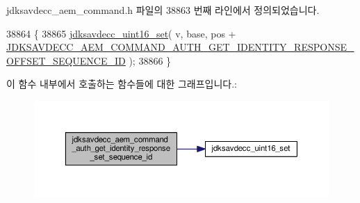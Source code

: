jdksavdecc\+\_\+aem\+\_\+command.\+h 파일의 38863 번째 라인에서 정의되었습니다.


\begin{DoxyCode}
38864 \{
38865     \hyperlink{group__endian_ga14b9eeadc05f94334096c127c955a60b}{jdksavdecc\_uint16\_set}( v, base, pos + 
      \hyperlink{group__command__auth__get__identity__response_gad7814ce95b40a40d7ab7251616d417e9}{JDKSAVDECC\_AEM\_COMMAND\_AUTH\_GET\_IDENTITY\_RESPONSE\_OFFSET\_SEQUENCE\_ID}
       );
38866 \}
\end{DoxyCode}


이 함수 내부에서 호출하는 함수들에 대한 그래프입니다.\+:
\nopagebreak
\begin{figure}[H]
\begin{center}
\leavevmode
\includegraphics[width=350pt]{group__command__auth__get__identity__response_ga304f78d196e21c23e5881c38aa839a09_cgraph}
\end{center}
\end{figure}



